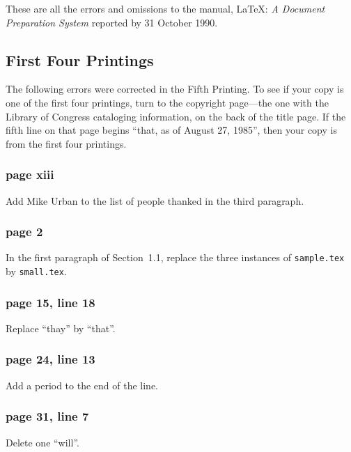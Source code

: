  
These are all the errors and omissions to the manual, \LaTeX: {\em A
Document Preparation System} reported by 31 October 1990.
 
\subsection{First Four Printings}
 
The following errors were corrected in the Fifth Printing.  To see if
your copy is one of the first four printings, turn to the copyright
page---the one with the Library of Congress cataloging information, on
the back of the title page.  If the fifth line on that page begins
``that, as of August 27, 1985'', then your copy is from the first four
printings.
 
\subsubsection*{page xiii}
 
Add Mike Urban to the list of people thanked in the third paragraph.
 
\subsubsection*{page 2}
 
In the first paragraph of Section~1.1, replace the three instances of
{\tt sample.tex} by {\tt small.tex}.
 
\subsubsection*{page 15, line 18}
 
Replace ``thay'' by ``that''.
 
\subsubsection*{page 24, line 13}
Add a period to the end of the line.
 
\subsubsection*{page 31, line 7}
Delete one ``will''.
 
